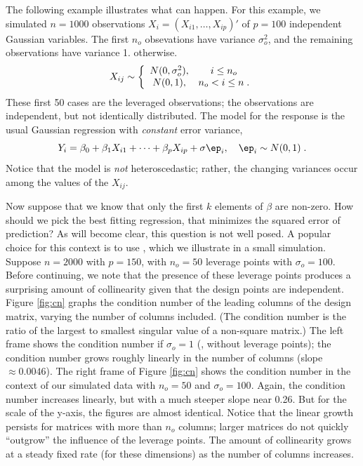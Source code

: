 \documentclass[12pt]{article}
\begin{document}
 The following example illustrates what can happen.  For this example, we
 simulated $n = 1000$ observations $X_i = (X_{i1},\ldots,X_{ip})'$ of $p = 100$
 independent Gaussian variables.  The first $n_o$ obsevations have variance
 $\sigma_o^2$, and the remaining observations have variance 1.  otherwise.
 \begin{equation}
    X_{ij} \sim \left\{ \begin{array}{cc}
              N(0,\sigma_o^2), & i \le n_o \cr
              N(0,1)    , & n_o < i \le n \;.
   \end{array} \right.
 \label{eq:Xij}
 \end{equation}
 These first 50 cases are the leveraged observations; the observations are
 independent, but not identically distributed.  The model for the response is
the usual Gaussian regression with {\em constant} error variance,
 \begin{equation}
   Y_i = \beta_0 + \beta_1 X_{i1} + \cdots + \beta_p X_{ip} + \sigma \ep_i,
        \quad \ep_i \sim N(0,1) \;.   
 \label{eq:Yi}
 \end{equation}
 Notice that the model is {\em not} heteroscedastic; rather, the changing
variances occur among the values of the $X_{ij}$.


 Now suppose that we know that only the first $k$ elements of $\beta$ are
 non-zero.  How should we pick the best fitting regression, that minimizes the
 squared error of prediction?  As will become clear, this question is not well
 posed.  A popular choice for this context is to use \aic, which we illustrate
 in a small simulation.  Suppose $n = 2000$ with $p = 150$, with $n_o=50$
 leverage points with $\sigma_o = 100$.  Before continuing, we note that the
 presence of these leverage points produces a surprising amount of collinearity
 given that the design points are independent.  Figure \ref{fig:cn} graphs the
 condition number of the leading columns of the design matrix, varying the
 number of columns included.  (The condition number is the ratio of the largest
 to smallest singular value of a non-square matrix.) The left frame shows the
 condition number if $\sigma_o = 1$ (\ie, without leverage points); the
 condition number grows roughly linearly in the number of columns (slope
 $\approx 0.0046$).  The right frame of Figure \ref{fig:cn} shows the condition
 number in the context of our simulated data with $n_o = 50$ and $\sigma_o =
 100$.  Again, the condition number increases linearly, but with a much steeper
 slope near 0.26.  But for the scale of the y-axis, the figures are almost
 identical.  Notice that the linear growth persists for matrices with more than
 $n_o$ columns; larger matrices do not quickly ``outgrow'' the influence of the
 leverage points.  The amount of collinearity grows at a steady fixed rate (for
these dimensions) as the number of columns increases.
\end{document}
